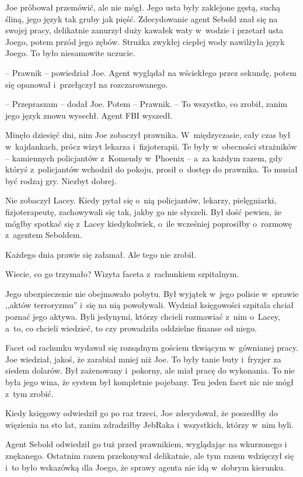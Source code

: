\documentclass[oneside,polish,11pt,sfheadings]{mwbk}
\begin{document}
Joe próbował przemówić, ale nie mógł. Jego usta były zaklejone gęstą,
suchą śliną, jego język tak gruby jak pięść. Zdecydowanie agent Sebold
znał się na swojej pracy, delikatnie zanurzył duży kawałek waty w~wodzie
i przetarł usta Joego, potem przód jego zębów. Strużka zwykłej ciepłej
wody nawilżyła język Joego. To było niesamowite uczucie.

-- Prawnik -- powiedział Joe. Agent wyglądał na wściekłego przez sekundę,
potem się opanował i~przełączył na rozczarowanego. 

-- Przepraszam -- dodał Joe. Potem -- Prawnik. -- To wszystko, co zrobił, zanim jego język znowu
wysechł. Agent FBI wyszedł.

Minęło dziesięć dni, nim Joe zobaczył prawnika. W~międzyczasie, cały
czas był w~kajdankach, prócz wizyt lekarza i~fizjoterapii. Te były w~obecności strażników -- kamiennych policjantów z~Komendy w~Phoenix -- a~za
każdym razem, gdy któryś z~policjantów wchodził do pokoju, prosił o~dostęp do prawnika. To musiał być rodzaj gry. Niezbyt dobrej.

Nie zobaczył Lacey. Kiedy pytał się o~nią policjantów, lekarzy,
pielęgniarki, fizjoterapeutę, zachowywali się tak, jakby go nie
słyszeli. Był dość pewien, że mógłby spotkać się z~Lacey kiedykolwiek, o~ile wcześniej poprosiłby o~rozmowę z~agentem Seboldem.

Każdego dnia prawie się załamał. Ale tego nie zrobił.

Wiecie, co go trzymało? Wizyta faceta z~rachunkiem szpitalnym.

Jego ubezpieczenie nie obejmowało pobytu. Był wyjątek w~jego polisie w~sprawie ,,aktów terroryzmu'' i~się na nią powoływali. Wydział
księgowości szpitala chciał poznać jego aktywa. Byli jedynymi, którzy
chcieli rozmawiać z~nim o~Lacey, a~to, co chcieli wiedzieć, to czy
prowadziła oddzielne finanse od niego.

Facet od rachunku wydawał się rozsądnym gościem tkwiącym w~gównianej
pracy. Joe wiedział, jakoś, że zarabiał mniej niż Joe. To były tanie
buty i~fryzjer za siedem dolarów. Był zażenowany i~pokorny, ale miał
pracę do wykonania. To nie była jego wina, że system był kompletnie
pojebany. Ten jeden facet nic nie mógł z~tym zrobić.

Kiedy księgowy odwiedził go po raz trzeci, Joe zdecydował, że poszedłby
do więzienia na sto lat, zanim zdradziłby JebRaka i~wszystkich, którzy w~nim byli.

Agent Sebold odwiedził go tuż przed prawnikiem, wyglądając na wkurzonego
i znękanego. Ostatnim razem przekonywał delikatnie, ale tym razem
wdzięczył się i~to było wskazówką dla Joego, że sprawy agenta nie idą w~dobrym kierunku.
\end{document}
